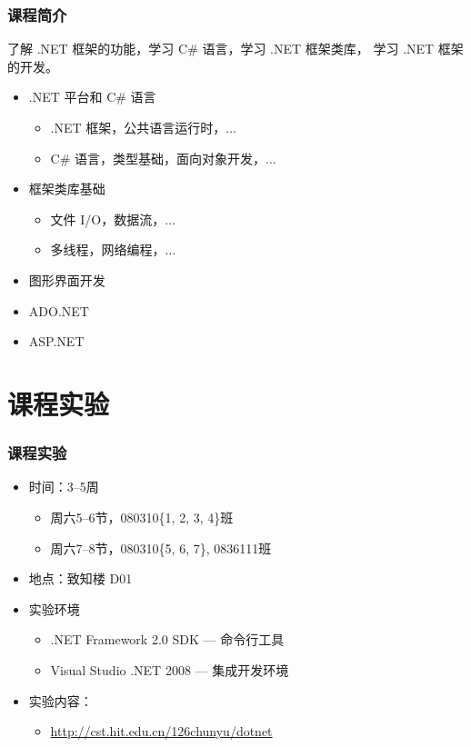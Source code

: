 \begin{frame}
\frametitle{课程简介}

\CJKindent 了解 .NET 框架的功能，学习 C\# 语言，学习 .NET 框架类库， 学习
.NET 框架的开发。

\begin{itemize}
\item .NET 平台和 C\# 语言
\begin{itemize}
\item .NET 框架，公共语言运行时，$\ldots$
\item C\# 语言，类型基础，面向对象开发，$\ldots$
\end{itemize}
\item 框架类库基础
  \begin{itemize}
  \item 文件 I/O，数据流，$\ldots$
  \item 多线程，网络编程，$\ldots$
  \end{itemize}
\item 图形界面开发
\item ADO.NET
\item ASP.NET
\end{itemize}
\end{frame}

\section{课程实验}
\begin{frame}
\frametitle{课程实验}
\begin{itemize}
    \setlength{\itemsep}{14pt plus 1pt}
 \item 时间：3--5周
\begin{itemize}
  \setlength{\itemsep}{6pt plus 1pt}
\item 周六5--6节，080310\{1, 2, 3, 4\}班
\item 周六7--8节，080310\{5, 6, 7\}, 0836111班
\end{itemize}
\item 地点：致知楼 D01
\item 实验环境
\begin{itemize}
    \setlength{\itemsep}{6pt plus 1pt}
\item .NET Framework 2.0 SDK --- 命令行工具
\item Visual Studio .NET 2008 --- 集成开发环境
\end{itemize}
\item 实验内容：
  \begin{itemize}
  \item \href{http://cst.hit.edu.cn/~chunyu/dotnet}{http://cst.hit.edu.cn/\char126chunyu/dotnet}
  \end{itemize}
\end{itemize}

\end{frame}

